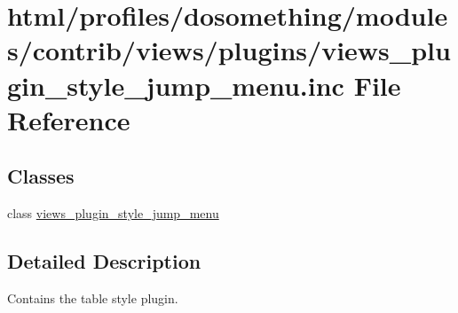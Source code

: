 \hypertarget{views__plugin__style__jump__menu_8inc}{
\section{html/profiles/dosomething/modules/contrib/views/plugins/views\_\-plugin\_\-style\_\-jump\_\-menu.inc File Reference}
\label{views__plugin__style__jump__menu_8inc}
}
\subsection*{Classes}
\begin{DoxyCompactItemize}
\item 
class \hyperlink{classviews__plugin__style__jump__menu}{views\_\-plugin\_\-style\_\-jump\_\-menu}
\end{DoxyCompactItemize}


\subsection{Detailed Description}
Contains the table style plugin. 